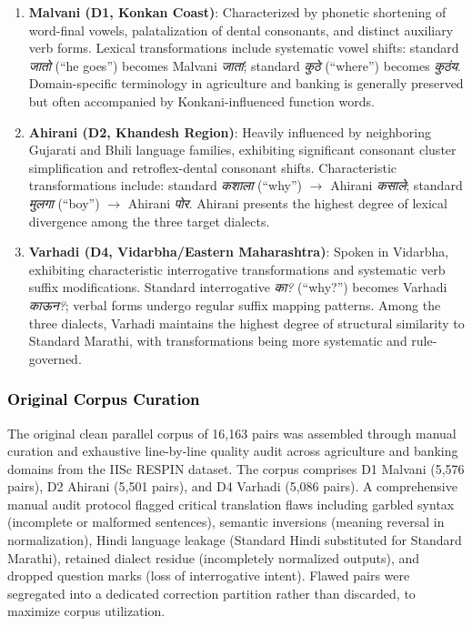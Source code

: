 \begin{enumerate}
    \item \textbf{Malvani (D1, Konkan Coast)}: Characterized by phonetic shortening of word-final vowels, palatalization of dental consonants, and distinct auxiliary verb forms. Lexical transformations include systematic vowel shifts: standard \emph{जातो} (``he goes'') becomes Malvani \emph{जातां}; standard \emph{कुठे} (``where'') becomes \emph{कुठंय}. Domain-specific terminology in agriculture and banking is generally preserved but often accompanied by Konkani-influenced function words.
    \item \textbf{Ahirani (D2, Khandesh Region)}: Heavily influenced by neighboring Gujarati and Bhili language families, exhibiting significant consonant cluster simplification and retroflex-dental consonant shifts. Characteristic transformations include: standard \emph{कशाला} (``why'') $\rightarrow$ Ahirani \emph{कसाले}; standard \emph{मुलगा} (``boy'') $\rightarrow$ Ahirani \emph{पोर}. Ahirani presents the highest degree of lexical divergence among the three target dialects.
    \item \textbf{Varhadi (D4, Vidarbha/Eastern Maharashtra)}: Spoken in Vidarbha, exhibiting characteristic interrogative transformations and systematic verb suffix modifications. Standard interrogative \emph{का?} (``why?'') becomes Varhadi \emph{काऊन?}; verbal forms undergo regular suffix mapping patterns. Among the three dialects, Varhadi maintains the highest degree of structural similarity to Standard Marathi, with transformations being more systematic and rule-governed.
\end{enumerate}

\subsubsection{\textcolor{black}{Original Corpus Curation}}

The original clean parallel corpus of 16,163 pairs was assembled through manual curation and exhaustive line-by-line quality audit across agriculture and banking domains from the IISc RESPIN dataset. The corpus comprises D1 Malvani (5,576 pairs), D2 Ahirani (5,501 pairs), and D4 Varhadi (5,086 pairs). A comprehensive manual audit protocol flagged critical translation flaws including garbled syntax (incomplete or malformed sentences), semantic inversions (meaning reversal in normalization), Hindi language leakage (Standard Hindi substituted for Standard Marathi), retained dialect residue (incompletely normalized outputs), and dropped question marks (loss of interrogative intent). Flawed pairs were segregated into a dedicated correction partition rather than discarded, to maximize corpus utilization.


